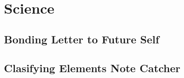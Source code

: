 \section{Science}
\subsection{Bonding Letter to Future Self}

\subsection{Clasifying Elements Note Catcher}


